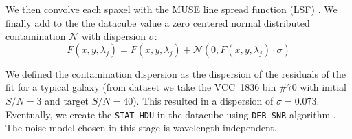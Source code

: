 We then convolve each spaxel with the MUSE line spread function (LSF) \citep[$F_{\mathrm{udf}10}$, eq. (8) in][]{Bacon2017}.
We finally add to the the datacube value a zero centered normal distributed contamination $\mathcal{N}$ with dispersion $\sigma$:
\begin{equation}
  F(x,y, \lambda_j) = F(x,y, \lambda_j) + \mathcal{N}(0, F(x,y, \lambda_j)\cdot \sigma )
\end{equation}

We defined the contamination dispersion as the dispersion of the residuals of the fit for a typical galaxy (from \citet{Bidaran2020} dataset we take the VCC~1836 bin \#70 with initial $S/N=3$ and target $S/N=40$).
This resulted in a dispersion of $\sigma = 0.073$.
Eventually, we create the \verb|STAT HDU| in the datacube using \verb|DER_SNR| algorithm \citep{Stoehr2008}. The noise model chosen in this stage is wavelength independent.



